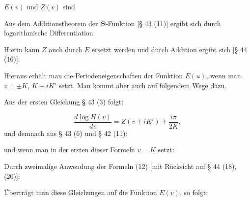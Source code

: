 
$E(v)$ und $Z(v)$ sind 

Aus dem Additionstheorem der $\Theta$-Funktion [§ 43 (11)] ergibt
sich durch logarithmische Differentiation:



Hierin kann $Z$ auch durch $E$ ersetzt werden und durch
Addition ergibt sich [§ 44 (16)]:


Hieraus erhält man die Periodeneigenschaften der Funktion
$E(u)$, wenn man $v=\pm K$, $K+iK'$ setzt. Man kommt aber
auch auf folgendem Wege dazu.

Aus der ersten Gleichung § 43 (3) folgt:

\[
\dfrac{d\log H(v)}{dv} = Z(v+iK') + \dfrac{i\pi}{2K},
\]
und demnach aus § 43 (6) und § 42 (11):

und wenn man in der ersten dieser Formeln $v=K$ setzt:


Durch zweimalige Anwendung der Formeln (12) [mit Rücksicht
auf § 44 (18), (20)]:


Überträgt man diese Gleichungen auf die Funktion $E(v)$, so
folgt:


